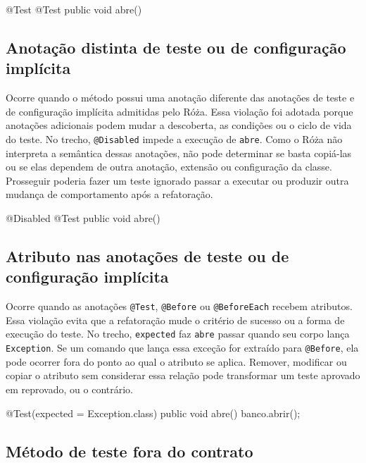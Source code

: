 \begin{violationexample}
@Test
@Test
public void abre() {}
\end{violationexample}

\subsection{Anotação distinta de teste ou de configuração implícita}

Ocorre quando o método possui uma anotação diferente das anotações de teste e de configuração implícita admitidas pelo Róża. Essa violação foi adotada porque anotações adicionais podem mudar a descoberta, as condições ou o ciclo de vida do teste. No trecho, \texttt{@Disabled} impede a execução de \texttt{abre}. Como o Róża não interpreta a semântica dessas anotações, não pode determinar se basta copiá-las ou se elas dependem de outra anotação, extensão ou configuração da classe. Prosseguir poderia fazer um teste ignorado passar a executar ou produzir outra mudança de comportamento após a refatoração.

\begin{violationexample}
@Disabled
@Test
public void abre() {}
\end{violationexample}

\subsection{Atributo nas anotações de teste ou de configuração implícita}

Ocorre quando as anotações \texttt{@Test}, \texttt{@Before} ou \texttt{@BeforeEach} recebem atributos. Essa violação evita que a refatoração mude o critério de sucesso ou a forma de execução do teste. No trecho, \texttt{expected} faz \texttt{abre} passar quando seu corpo lança \texttt{Exception}. Se um comando que lança essa exceção for extraído para \texttt{@Before}, ela pode ocorrer fora do ponto ao qual o atributo se aplica. Remover, modificar ou copiar o atributo sem considerar essa relação pode transformar um teste aprovado em reprovado, ou o contrário.

\begin{violationexample}
@Test(expected = Exception.class)
public void abre() { banco.abrir(); }
\end{violationexample}

\subsection{Método de teste fora do contrato}

